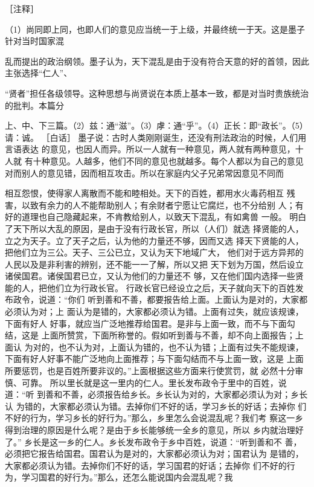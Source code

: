 \documentclass[12pt,UTF8]{ctexbook}
\begin{document}
［注释］ 

（1）尚同即上同，也即人们的意见应当统一于上级，并最终统一于天。这是墨子针对当时国家混 

乱而提出的政治纲领。墨子认为，天下混乱是由于没有符合天意的好的首领，因此主张选择“仁人”、 

“贤者”担任各级领导。这种思想与尚贤说在本质上基本一致，都是对当时贵族统治的批判。本篇分 

上、中、下三篇。（2）兹：通“滋”。（3）虖：通“乎”。（4）正长：即“政长”。（5）请：诚。 
［白话］ 
墨子说：古时人类刚刚诞生，还没有刑法政治的时候，人们用言语表达 
的意见，也因人而异。所以一人就有一种意见，两人就有两种意见，十人就 
有十种意见。人越多，他们不同的意见也就越多。每个人都以为自己的意见 
对而别人的意见错，因而相互攻击。所以在家庭内父子兄弟常因意见不同而 

相互怨恨，使得家人离散而不能和睦相处。天下的百姓，都用水火毒药相互 
残害，以致有余力的人不能帮助别人；有余财者宁愿让它腐烂，也不分给别 
人；有好的道理也自己隐藏起来，不肯教给别人，以致天下混乱，有如禽兽 
一般。 
明白了天下所以大乱的原因，是由于没有行政长官，所以（人们）就选 
择贤能的人，立之为天子。立了天子之后，认为他的力量还不够，因而又选 
择天下贤能的人，把他们立为三公。天子、三公已立，又认为天下地域广大， 
他们对于远方异邦的人民以及是非利害的辨别，还不能一一了解，所以又把 
天下划为万国，然后设立诸侯国君。诸侯国君已立，又认为他们的力量还不 
够，又在他们国内选择一些贤能的人，把他们立为行政长官。 
行政长官已经设立之后，天子就向天下的百姓发布政令，说道：“你们 
听到善和不善，都要报告给上面。上面认为是对的，大家都必须认为对；上 
面认为是错的，大家都必须认为错。上面有过失，就应该规谏，下面有好人 
好事，就应当广泛地推荐给国君。是非与上面一致，而不与下面勾结，这是 
上面所赞赏，下面所称誉的。假如听到善与不善，却不向上面报告；上面认 
为对的，也不认为对，上面认为错的，也不认为错；上面有过失不能规谏， 
下面有好人好事不能广泛地向上面推荐；与下面勾结而不与上面一致，这是 
上面所要惩罚，也是百姓所要非议的。”上面根据这些方面来行使赏罚，就 
必然十分审慎、可靠。 
所以里长就是这一里内的仁人。里长发布政令于里中的百姓，说道：“听 
到善和不善，必须报告给乡长。乡长认为对的，大家都必须认为对；乡长认 
为错的，大家都必须认为错。去掉你们不好的话，学习乡长的好话；去掉你 
们不好的行为，学习乡长的好行为。”那么，乡里怎么会说混乱呢？我们考 
察这一乡得到治理的原因是什么呢？是由于乡长能够统一全乡的意见，所以 
乡内就治理好了。” 
乡长是这一乡的仁人。乡长发布政令于乡中百姓，说道：“听到善和不 
善，必须把它报告给国君。国君认为是对的，大家都必须认为对；国君认为 
是错的，大家都必须认为错。去掉你们不好的话，学习国君的好话；去掉你 
们不好的行为，学习国君的好行为。”那么，还怎么能说国内会混乱呢？我 
\end{document}
